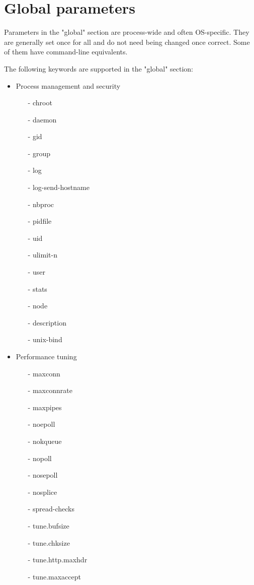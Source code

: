 \chapter{Global parameters}
Parameters in the "global" section are process-wide and often OS-specific. They
are generally set once for all and do not need being changed once correct. Some
of them have command-line equivalents.

The following keywords are supported in the "global" section:

\begin{itemize}
\item Process management and security
  \begin{itemize}
    \item[-] chroot
    \item[-] daemon
    \item[-] gid
    \item[-] group
    \item[-] log
    \item[-] log-send-hostname
    \item[-] nbproc
    \item[-] pidfile
    \item[-] uid
    \item[-] ulimit-n
    \item[-] user
    \item[-] stats
    \item[-] node
    \item[-] description
    \item[-] unix-bind
  \end{itemize}
\item Performance tuning
  \begin{itemize}
    \item[-] maxconn
    \item[-] maxconnrate
    \item[-] maxpipes
    \item[-] noepoll
    \item[-] nokqueue
    \item[-] nopoll
    \item[-] nosepoll
    \item[-] nosplice
    \item[-] spread-checks
    \item[-] tune.bufsize
    \item[-] tune.chksize
    \item[-] tune.http.maxhdr
    \item[-] tune.maxaccept

\end{itemize}
\end{itemize}
